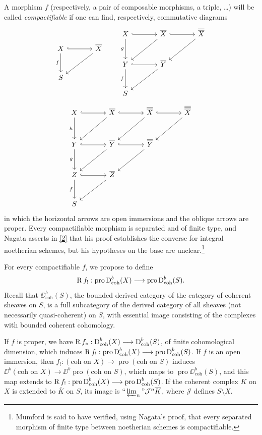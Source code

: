 A morphism $f$ (respectively, a pair of composable morphisms, a triple, \dots) will be called \emph{compactifiable} if one can find, respectively, commutative diagrams
\[
\begin{tikzcd}[row sep=large,column sep=large]
X \ar[r,hook] \ar[d,"f"'] & \overline X \ar[dl] \\
S
\end{tikzcd}
\qquad
\begin{tikzcd}[row sep=large,column sep=large]
X \ar[r,hook] \ar[d,"g"'] & \overline X \ar[r,hook] \ar[dl]
 & \overline{\overline X} \ar[dl] \\
Y \ar[r,hook] \ar[d,"f"'] & \overline Y \ar[dl] \\
S
\end{tikzcd}
\]
\[
\begin{tikzcd}[row sep=large,column sep=large]
X \ar[r,hook] \ar[d,"h"'] & \overline X \ar[r,hook] \ar[dl]
 & \overline{\overline X} \ar[r,hook] \ar[dl]
 & \overline{\overline{\overline X}} \ar[dl] \\
Y \ar[r,hook] \ar[d,"g"'] & \overline Y \ar[r,hook] \ar[dl]
 & \overline{\overline Y} \ar[dl] \\
Z \ar[r,hook] \ar[d,"f"'] & \overline Z \ar[dl] \\
S
\end{tikzcd}
\]
in which the horizontal arrows are open immersions and the oblique arrows are proper. Every compactifiable morphism is separated and of finite type, and Nagata asserts in \hyperref[appen:bib2]{[2]} that his proof establishes the converse for integral noetherian schemes, but his hypotheses on the base are unclear.\footnote{Mumford is said to have verified, using Nagata's proof, that every separated morphism of finite type between noetherian schemes is compactifiable.}

For every compactifiable $f$, we propose to define
\[
\operatorname{R} f_!:\operatorname{pro}\operatorname{D}_{\operatorname{coh}}^b(X)\longrightarrow\operatorname{pro}\operatorname{D}_{\operatorname{coh}}^b(S).
\] Recall that $\DD_{\operatorname{coh}}^b(S)$, the bounded derived category of the category of coherent sheaves on $S$, is a full subcategory of the derived category of all sheaves (not necessarily quasi-coherent) on $S$, with essential image consisting of the complexes with bounded coherent cohomology.

If $f$ is proper, we have $\operatorname{R} f_*:\operatorname{D}_{\operatorname{coh}}^b(X)\longrightarrow\operatorname{D}_{\operatorname{coh}}^b(S)$, of finite cohomological dimension, which induces $\operatorname{R} f_!:\operatorname{pro}\operatorname{D}_{\operatorname{coh}}^b(X)\longrightarrow\operatorname{pro}\operatorname{D}_{\operatorname{coh}}^b(S)$. If $f$ is an open immersion, then $f_!:(\text{coh on }X)\longrightarrow\operatorname{pro}(\text{coh on }S)$ induces $\DD^b(\text{coh on }X)\longrightarrow\DD^b\operatorname{pro}(\text{coh on }S)$, which maps to $\operatorname{pro}\DD_{\operatorname{coh}}^b(S)$, and this map extends to $\operatorname{R} f_!:\operatorname{pro}\operatorname{D}_{\operatorname{coh}}^b(X)\longrightarrow\operatorname{pro}\operatorname{D}_{\operatorname{coh}}^b(S)$. If the coherent complex $K$ on $X$ is extended to $\overline K$ on $S$, its image is $\text{``}\varprojlim_n\text{''}\mathcal J^n\overline K$, where $\mathcal J$ defines $S\setminus X$.

